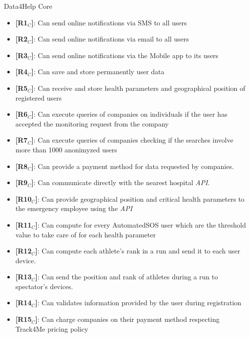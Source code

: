 \noindent Data4Help Core
\begin{itemize}
    \item \textbf{[R1$_C$]}: Can send online notifications via SMS to all users 
    \item \textbf{[R2$_C$]}: Can send online notifications via email to all users
    \item \textbf{[R3$_C$]}: Can send online notifications via the Mobile app to its users
    \item \textbf{[R4$_C$]}: Can save and store permanently user data
    \item \textbf{[R5$_C$]}: Can receive and store health parameters and geographical position of registered users
    \item \textbf{[R6$_C$]}: Can execute queries of companies on individuals if the user has accepted the monitoring request from the company
    \item \textbf{[R7$_C$]}: Can execute queries of companies checking if the searches involve more than 1000 anonimyzed users 
    \item \textbf{[R8$_C$]}: Can provide a payment method for data requested by companies.
    \item \textbf{[R9$_C$]}: Can communicate directly with the nearest hospital \textit{API}.
    \item \textbf{[R10$_C$]}: Can provide geographical position and critical health parameters to the emergency employee using the \textit{API}
    \item \textbf{[R11$_C$]}: Can compute for every AutomatedSOS user which are the threshold value to take care of for each health parameter
    \item \textbf{[R12$_C$]}: Can compute each athlete's rank in a run and send it to each user device.
    \item \textbf{[R13$_C$]}: Can send the position and rank of athletes during a run to spectator's devices.
    \item \textbf{[R14$_C$]}: Can validates information provided by the user during registration
    \item \textbf{[R15$_C$]}: Can charge companies on their payment method respecting Track4Me pricing policy



\end{itemize}
